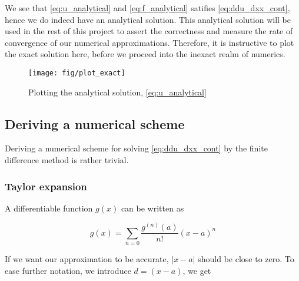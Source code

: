 \documentclass[a4paper]{article}
\begin{document}
We see that \eqref{eq:u_analytical} and \eqref{eq:f_analytical} satifies \eqref{eq:ddu_dxx_cont}, hence we do indeed have an analytical solution.
This analytical solution will be used in the rest of this project to assert the correctness and measure the rate of convergence of our numerical approximations.
Therefore, it is instructive to plot the exact solution here, before we proceed into the inexact realm of numerics.



\begin{figure}[ht]
\texttt{[image: fig/plot\_exact]}
\caption{Plotting the analytical solution, \eqref{eq:u_analytical}}
\end{figure}

\subsection{Deriving a numerical scheme}
Deriving a numerical scheme for solving \eqref{eq:ddu_dxx_cont} by the finite difference method is rather trivial.

\subsubsection{Taylor expansion}
A differentiable function $g(x)$ can be written as

\begin{equation}
    g(x) = \sum_{n=0} \frac{g^{(n)}(a)}{n!} (x-a)^n
\end{equation}

If we want our approximation to be accurate, $|x - a|$ should be close to zero. To ease further notation, we introduce $d = (x - a)$, we get
\end{document}
